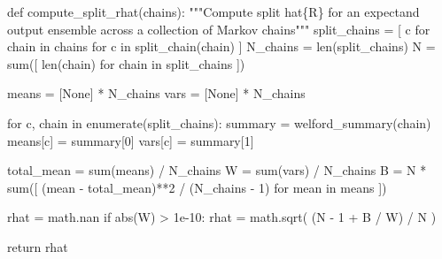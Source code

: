 \documentclass[
  letterpaper,
  DIV=11,
  numbers=noendperiod]{scrartcl}
\newenvironment{Shaded}{\begin{snugshade}}{\end{snugshade}}
\newcommand{\BuiltInTok}[1]{\textcolor[rgb]{0.00,0.23,0.31}{#1}}
\newcommand{\CommentTok}[1]{\textcolor[rgb]{0.37,0.37,0.37}{#1}}
\newcommand{\ControlFlowTok}[1]{\textcolor[rgb]{0.00,0.23,0.31}{#1}}
\newcommand{\DecValTok}[1]{\textcolor[rgb]{0.68,0.00,0.00}{#1}}
\newcommand{\FloatTok}[1]{\textcolor[rgb]{0.68,0.00,0.00}{#1}}
\newcommand{\KeywordTok}[1]{\textcolor[rgb]{0.00,0.23,0.31}{#1}}
\newcommand{\NormalTok}[1]{\textcolor[rgb]{0.00,0.23,0.31}{#1}}
\newcommand{\OperatorTok}[1]{\textcolor[rgb]{0.37,0.37,0.37}{#1}}
\newcommand{\VariableTok}[1]{\textcolor[rgb]{0.07,0.07,0.07}{#1}}
\begin{document}
\begin{Shaded}
\begin{Highlighting}[]
\KeywordTok{def}\NormalTok{ compute\_split\_rhat(chains):}
  \CommentTok{"""Compute split hat\{R\} for an expectand output ensemble across}
\CommentTok{     a collection of Markov chains"""}
\NormalTok{  split\_chains }\OperatorTok{=}\NormalTok{ [ c }\ControlFlowTok{for}\NormalTok{ chain }\KeywordTok{in}\NormalTok{ chains }\ControlFlowTok{for}\NormalTok{ c }\KeywordTok{in}\NormalTok{ split\_chain(chain) ]}
\NormalTok{  N\_chains }\OperatorTok{=} \BuiltInTok{len}\NormalTok{(split\_chains)}
\NormalTok{  N }\OperatorTok{=} \BuiltInTok{sum}\NormalTok{([ }\BuiltInTok{len}\NormalTok{(chain) }\ControlFlowTok{for}\NormalTok{ chain }\KeywordTok{in}\NormalTok{ split\_chains ])}
  
\NormalTok{  means }\OperatorTok{=}\NormalTok{ [}\VariableTok{None}\NormalTok{] }\OperatorTok{*}\NormalTok{ N\_chains}
  \BuiltInTok{vars} \OperatorTok{=}\NormalTok{ [}\VariableTok{None}\NormalTok{] }\OperatorTok{*}\NormalTok{ N\_chains}
  
  \ControlFlowTok{for}\NormalTok{ c, chain }\KeywordTok{in} \BuiltInTok{enumerate}\NormalTok{(split\_chains):}
\NormalTok{    summary }\OperatorTok{=}\NormalTok{ welford\_summary(chain)}
\NormalTok{    means[c] }\OperatorTok{=}\NormalTok{ summary[}\DecValTok{0}\NormalTok{]}
    \BuiltInTok{vars}\NormalTok{[c] }\OperatorTok{=}\NormalTok{ summary[}\DecValTok{1}\NormalTok{]}
  
\NormalTok{  total\_mean }\OperatorTok{=} \BuiltInTok{sum}\NormalTok{(means) }\OperatorTok{/}\NormalTok{ N\_chains}
\NormalTok{  W }\OperatorTok{=} \BuiltInTok{sum}\NormalTok{(}\BuiltInTok{vars}\NormalTok{) }\OperatorTok{/}\NormalTok{ N\_chains}
\NormalTok{  B }\OperatorTok{=}\NormalTok{ N }\OperatorTok{*} \BuiltInTok{sum}\NormalTok{([ (mean }\OperatorTok{{-}}\NormalTok{ total\_mean)}\OperatorTok{**}\DecValTok{2} \OperatorTok{/}\NormalTok{ (N\_chains }\OperatorTok{{-}} \DecValTok{1}\NormalTok{) }\ControlFlowTok{for}\NormalTok{ mean }\KeywordTok{in}\NormalTok{ means ])}
  
\NormalTok{  rhat }\OperatorTok{=}\NormalTok{ math.nan}
  \ControlFlowTok{if} \BuiltInTok{abs}\NormalTok{(W) }\OperatorTok{\textgreater{}} \FloatTok{1e{-}10}\NormalTok{:}
\NormalTok{    rhat }\OperatorTok{=}\NormalTok{ math.sqrt( (N }\OperatorTok{{-}} \DecValTok{1} \OperatorTok{+}\NormalTok{ B }\OperatorTok{/}\NormalTok{ W) }\OperatorTok{/}\NormalTok{ N )}
  
  \ControlFlowTok{return}\NormalTok{ rhat}
\end{Highlighting}
\end{Shaded}
\end{document}
